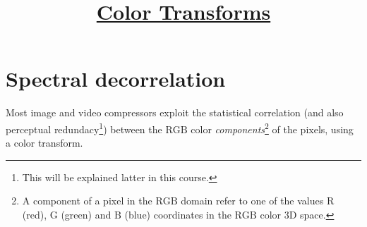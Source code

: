 
%


\title{\href{https://sistemas-multimedia.github.io/contents/color_transforms/}{Color Transforms}}

\maketitle
\tableofcontents

\section{Spectral decorrelation}

Most image and video compressors exploit the statistical correlation
(and also perceptual redundacy\footnote{This will be explained latter
  in this course.})  between the $\text{RGB}$ color
\emph{components}\footnote{A component of a pixel in the $\text{RGB}$
  domain refer to one of the values $\text{R}$ (red), $\text{G}$
  (green) and $\text{B}$ (blue) coordinates in the $\text{RGB}$ color
  3D space.}  of the pixels, using a color transform.

